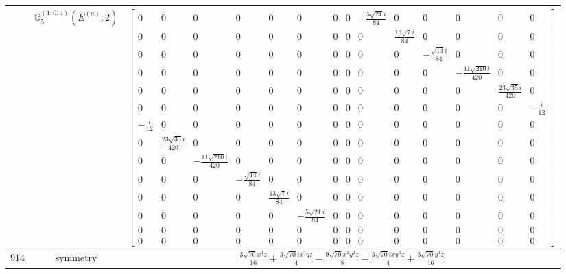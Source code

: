 \documentclass[fleqn,8pt,landscape]{jsarticle}
\begin{document}
\begin{longtable}{ccc}
$  $ & $ \mathbb{G}_{5}^{(1,0;a)}(E^{(a)},2) $ & $ \begin{bmatrix} 0 & 0 & 0 & 0 & 0 & 0 & 0 & 0 & - \frac{5 \sqrt{21} i}{84} & 0 & 0 & 0 & 0 & 0 \\ 0 & 0 & 0 & 0 & 0 & 0 & 0 & 0 & 0 & \frac{13 \sqrt{7} i}{84} & 0 & 0 & 0 & 0 \\ 0 & 0 & 0 & 0 & 0 & 0 & 0 & 0 & 0 & 0 & - \frac{\sqrt{14} i}{84} & 0 & 0 & 0 \\ 0 & 0 & 0 & 0 & 0 & 0 & 0 & 0 & 0 & 0 & 0 & - \frac{11 \sqrt{210} i}{420} & 0 & 0 \\ 0 & 0 & 0 & 0 & 0 & 0 & 0 & 0 & 0 & 0 & 0 & 0 & \frac{23 \sqrt{35} i}{420} & 0 \\ 0 & 0 & 0 & 0 & 0 & 0 & 0 & 0 & 0 & 0 & 0 & 0 & 0 & - \frac{i}{12} \\ - \frac{i}{12} & 0 & 0 & 0 & 0 & 0 & 0 & 0 & 0 & 0 & 0 & 0 & 0 & 0 \\ 0 & \frac{23 \sqrt{35} i}{420} & 0 & 0 & 0 & 0 & 0 & 0 & 0 & 0 & 0 & 0 & 0 & 0 \\ 0 & 0 & - \frac{11 \sqrt{210} i}{420} & 0 & 0 & 0 & 0 & 0 & 0 & 0 & 0 & 0 & 0 & 0 \\ 0 & 0 & 0 & - \frac{\sqrt{14} i}{84} & 0 & 0 & 0 & 0 & 0 & 0 & 0 & 0 & 0 & 0 \\ 0 & 0 & 0 & 0 & \frac{13 \sqrt{7} i}{84} & 0 & 0 & 0 & 0 & 0 & 0 & 0 & 0 & 0 \\ 0 & 0 & 0 & 0 & 0 & - \frac{5 \sqrt{21} i}{84} & 0 & 0 & 0 & 0 & 0 & 0 & 0 & 0 \\ 0 & 0 & 0 & 0 & 0 & 0 & 0 & 0 & 0 & 0 & 0 & 0 & 0 & 0 \\ 0 & 0 & 0 & 0 & 0 & 0 & 0 & 0 & 0 & 0 & 0 & 0 & 0 & 0 \end{bmatrix} $ \\ \hline
$ 914 $ & $ \text{symmetry} $ & $ \frac{3 \sqrt{70} x^{4} z}{16} + \frac{3 \sqrt{70} i x^{3} y z}{4} - \frac{9 \sqrt{70} x^{2} y^{2} z}{8} - \frac{3 \sqrt{70} i x y^{3} z}{4} + \frac{3 \sqrt{70} y^{4} z}{16} $ \\

\end{longtable}
\end{document}
